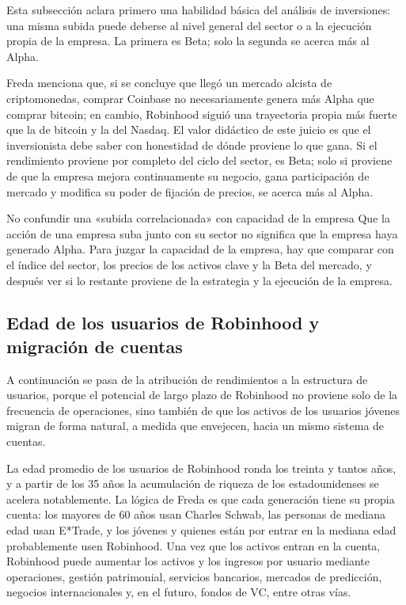 Esta subsección aclara primero una habilidad básica del análisis de inversiones: una misma subida puede deberse al nivel general del sector o a la ejecución propia de la empresa. La primera es Beta; solo la segunda se acerca más al Alpha.

Freda menciona que, si se concluye que llegó un mercado alcista de criptomonedas, comprar Coinbase no necesariamente genera más Alpha que comprar bitcoin; en cambio, Robinhood siguió una trayectoria propia más fuerte que la de bitcoin y la del Nasdaq. El valor didáctico de este juicio es que el inversionista debe saber con honestidad de dónde proviene lo que gana. Si el rendimiento proviene por completo del ciclo del sector, es Beta; solo si proviene de que la empresa mejora continuamente su negocio, gana participación de mercado y modifica su poder de fijación de precios, se acerca más al Alpha.

\begin{warningbox}{No confundir una «subida correlacionada» con capacidad de la empresa}
Que la acción de una empresa suba junto con su sector no significa que la empresa haya generado Alpha. Para juzgar la capacidad de la empresa, hay que comparar con el índice del sector, los precios de los activos clave y la Beta del mercado, y después ver si lo restante proviene de la estrategia y la ejecución de la empresa.
\end{warningbox}

\subsection{Edad de los usuarios de Robinhood y migración de cuentas}

A continuación se pasa de la atribución de rendimientos a la estructura de usuarios, porque el potencial de largo plazo de Robinhood no proviene solo de la frecuencia de operaciones, sino también de que los activos de los usuarios jóvenes migran de forma natural, a medida que envejecen, hacia un mismo sistema de cuentas.

La edad promedio de los usuarios de Robinhood ronda los treinta y tantos años, y a partir de los 35 años la acumulación de riqueza de los estadounidenses se acelera notablemente. La lógica de Freda es que cada generación tiene su propia cuenta: los mayores de 60 años usan Charles Schwab, las personas de mediana edad usan E*Trade, y los jóvenes y quienes están por entrar en la mediana edad probablemente usen Robinhood. Una vez que los activos entran en la cuenta, Robinhood puede aumentar los activos y los ingresos por usuario mediante operaciones, gestión patrimonial, servicios bancarios, mercados de predicción, negocios internacionales y, en el futuro, fondos de VC, entre otras vías.

